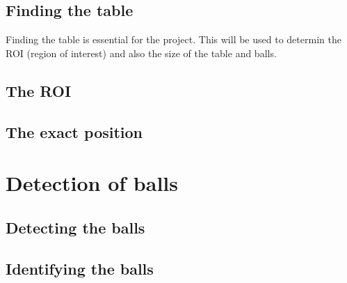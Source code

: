 	\subsection{Finding the table}
		Finding the table is essential for the project. This will be used to determin the ROI (region of interest) and also the size of the table and balls.
	\subsection{The ROI}
		
	\subsection{The exact  position}
		


\section{Detection of balls}
	\subsection{Detecting the balls}
		

	\subsection{Identifying the balls}
		







